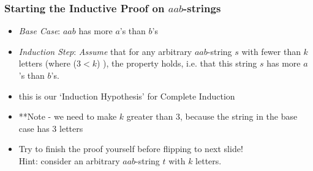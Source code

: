\begin{frame}
\frametitle{Starting the Inductive Proof on $aab$-strings}

\begin{itemize}[<+->]
\item \emph{Base Case}: $aab$ has more $a$'s than $b$'s

\item \emph{Induction Step}: {\it{Assume}} that for any arbitrary $aab$-string $s$ with fewer than $k$ letters (where ($3<k$) ), the property holds, i.e. that this string $s$ has more $a$'s than $b$'s.

\bi

\item this is our `Induction Hypothesis' for Complete Induction

\item **Note - we need to make $k$ greater than 3, because the string in the base case has 3 letters

\ei

\bigskip

\item Try to finish the proof yourself before flipping to next slide! \\ Hint: consider an arbitrary $aab$-string $t$ with $k$ letters. 



\end{itemize} 
\end{frame}


